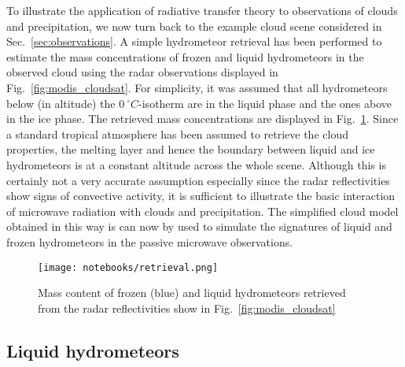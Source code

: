 To illustrate the application of radiative transfer theory to observations of
clouds and precipitation, we now turn back to the example cloud scene considered
in Sec.~\ref{sec:observations}. A simple hydrometeor retrieval has been
performed to estimate the mass concentrations of frozen and liquid hydrometeors
in the observed cloud using the radar observations displayed in
Fig.~\ref{fig:modis_cloudsat}. For simplicity, it was assumed that all
hydrometeors below (in altitude) the $0\ \unit{^\circ C}$-isotherm are in the
liquid phase and the ones above in the ice phase. The retrieved mass
concentrations are displayed in Fig.~\ref{fig:retrieval}. Since a standard
tropical atmosphere has been assumed to retrieve the cloud properties, the
melting layer and hence the boundary between liquid and ice hydrometeors is at a
constant altitude across the whole scene. Although this is certainly not a very
accurate assumption especially since the radar reflectivities show signs of
convective activity, it is sufficient to illustrate the basic interaction of
microwave radiation with clouds and precipitation. The simplified cloud model
obtained in this way is can now by used to simulate the signatures of liquid and
frozen hydrometeors in the passive microwave observations.

\begin{figure}
\texttt{[image: notebooks/retrieval.png]}
\caption{Mass content of frozen (blue) and liquid hydrometeors retrieved
from the radar reflectivities show in Fig.~\ref{fig:modis_cloudsat}}
\label{fig:retrieval}
\end{figure}

\subsection{Liquid hydrometeors}

